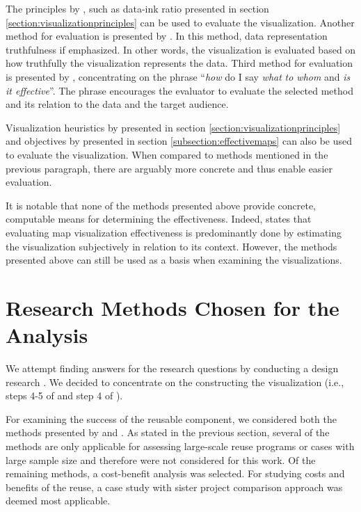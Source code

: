The principles by \citet{tufte_visual_1986}, such as data-ink ratio presented in section \ref{section:visualizationprinciples} can be used to evaluate the visualization. Another method for evaluation is presented by \citet{azzam_j-b_2013}. In this method, data representation truthfulness if emphasized. In other words, the visualization is evaluated based on how truthfully the visualization represents the data. Third method for evaluation is presented by \citet{kraak_cartographic_1998}, concentrating on the phrase ``\emph{how} do I say \emph{what} \emph{to whom} and \emph{is it effective}''. The phrase encourages the evaluator to evaluate the selected method and its relation to the data and the target audience.

Visualization heuristics by \citet{zuk_heuristics_2006} presented in section \ref{section:visualizationprinciples} and objectives by \citet{schlichtmann_visualization_2002} presented in section \ref{subsection:effectivemaps} can also be used to evaluate the visualization. When compared to methods mentioned in the previous paragraph, there are arguably more concrete and thus enable easier evaluation.

It is notable that none of the methods presented above provide concrete, computable means for determining the effectiveness. Indeed, \citet{kraak_cartographic_1998} states that evaluating map visualization effectiveness is predominantly done by estimating the visualization subjectively in relation to its context. However, the methods presented above can still be used as a basis when examining the visualizations.

\section{Research Methods Chosen for the Analysis}

We attempt finding answers for the research questions by conducting a design research . We decided to concentrate on the constructing the visualization (i.e., steps 4-5 of \citet{schlichtmann_visualization_2002} and step 4 of \citet{slocum_thematic_2014}).

For examining the success of the reusable component, we considered both the methods presented by \citet{frakes_software_1996} and \citet{mohagheghi_quality_2007}. As stated in the previous section, several of the methods are only applicable for assessing large-scale reuse programs or cases with large sample size and therefore were not considered for this work. Of the remaining methods, a cost-benefit analysis was selected. For studying costs and benefits of the reuse, a case study with sister project comparison approach was deemed most applicable. 

